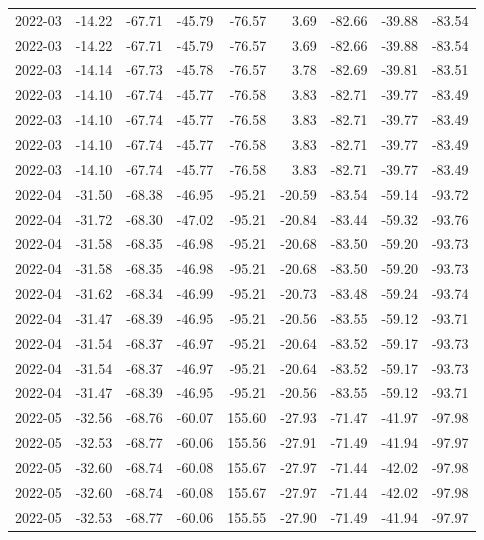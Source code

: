 \begin{table}[ht]
\begin{tabular}{lrrrrrrrr}
  2022-03 & -14.22 & -67.71 & -45.79 & -76.57 & 3.69 & -82.66 & -39.88 & -83.54 \\ 
  2022-03 & -14.22 & -67.71 & -45.79 & -76.57 & 3.69 & -82.66 & -39.88 & -83.54 \\ 
  2022-03 & -14.14 & -67.73 & -45.78 & -76.57 & 3.78 & -82.69 & -39.81 & -83.51 \\ 
  2022-03 & -14.10 & -67.74 & -45.77 & -76.58 & 3.83 & -82.71 & -39.77 & -83.49 \\ 
  2022-03 & -14.10 & -67.74 & -45.77 & -76.58 & 3.83 & -82.71 & -39.77 & -83.49 \\ 
  2022-03 & -14.10 & -67.74 & -45.77 & -76.58 & 3.83 & -82.71 & -39.77 & -83.49 \\ 
  2022-03 & -14.10 & -67.74 & -45.77 & -76.58 & 3.83 & -82.71 & -39.77 & -83.49 \\ 
  2022-04 & -31.50 & -68.38 & -46.95 & -95.21 & -20.59 & -83.54 & -59.14 & -93.72 \\ 
  2022-04 & -31.72 & -68.30 & -47.02 & -95.21 & -20.84 & -83.44 & -59.32 & -93.76 \\ 
  2022-04 & -31.58 & -68.35 & -46.98 & -95.21 & -20.68 & -83.50 & -59.20 & -93.73 \\ 
  2022-04 & -31.58 & -68.35 & -46.98 & -95.21 & -20.68 & -83.50 & -59.20 & -93.73 \\ 
  2022-04 & -31.62 & -68.34 & -46.99 & -95.21 & -20.73 & -83.48 & -59.24 & -93.74 \\ 
  2022-04 & -31.47 & -68.39 & -46.95 & -95.21 & -20.56 & -83.55 & -59.12 & -93.71 \\ 
  2022-04 & -31.54 & -68.37 & -46.97 & -95.21 & -20.64 & -83.52 & -59.17 & -93.73 \\ 
  2022-04 & -31.54 & -68.37 & -46.97 & -95.21 & -20.64 & -83.52 & -59.17 & -93.73 \\ 
  2022-04 & -31.47 & -68.39 & -46.95 & -95.21 & -20.56 & -83.55 & -59.12 & -93.71 \\ 
  2022-05 & -32.56 & -68.76 & -60.07 & 155.60 & -27.93 & -71.47 & -41.97 & -97.98 \\ 
  2022-05 & -32.53 & -68.77 & -60.06 & 155.56 & -27.91 & -71.49 & -41.94 & -97.97 \\ 
  2022-05 & -32.60 & -68.74 & -60.08 & 155.67 & -27.97 & -71.44 & -42.02 & -97.98 \\ 
  2022-05 & -32.60 & -68.74 & -60.08 & 155.67 & -27.97 & -71.44 & -42.02 & -97.98 \\ 
  2022-05 & -32.53 & -68.77 & -60.06 & 155.55 & -27.90 & -71.49 & -41.94 & -97.97 \\ 

\end{tabular}
\end{table}
